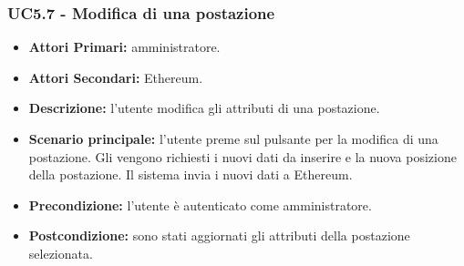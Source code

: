 \subsubsection{ UC5.7 - Modifica di una postazione}
\begin{itemize}
	\item\textbf{Attori Primari:}
	amministratore.
	\item\textbf{Attori Secondari:}
	Ethereum.
	\item\textbf{Descrizione:}
	l'utente modifica gli attributi di una postazione.
	\item\textbf{Scenario principale:} 
	l'utente preme sul pulsante per la modifica di una postazione. Gli vengono richiesti i nuovi dati da inserire e la nuova posizione della postazione. Il sistema invia i nuovi dati a Ethereum.
	\item\textbf{Precondizione:} 
	l'utente è autenticato come amministratore.
	\item\textbf{Postcondizione:}
	sono stati aggiornati gli attributi della postazione selezionata.
\end{itemize}

